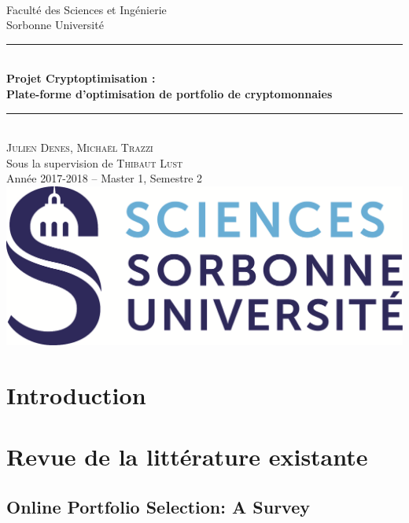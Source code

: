 \documentclass[a4paper]{article}
\newcommand{\HRule}{\rule{\linewidth}{0.5mm}}
\begin{document}
\begin{titlepage}
\begin{center}
~\\[1cm]
\Large Faculté des Sciences et Ingénierie\\Sorbonne Université\\[3.5cm]
\HRule 
\\[0.4cm]{\huge \bfseries Projet Cryptoptimisation :\\[0.1cm] Plate-forme d’optimisation de portfolio de cryptomonnaies\\[0.4cm]}
\HRule \\[1cm] 
\Large \textsc{Julien Denes, Michaël Trazzi} \\[0.1cm]
\Large Sous la supervision de \textsc{Thibaut Lust}\\[2cm]
\Large Année 2017-2018 -- Master 1, Semestre 2 \\[4cm]
\includegraphics[scale=0.3]{logo.png}
\end{center}
\end{titlepage}


\section*{Introduction}


\section{Revue de la littérature existante}

\subsection{Online Portfolio Selection: A Survey}
\end{document}
